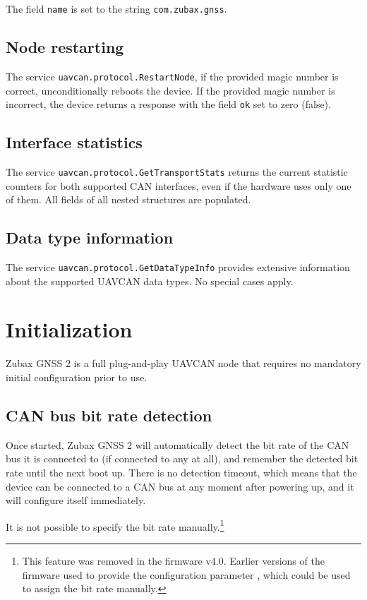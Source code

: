\documentclass{zubaxdoc}
\begin{document}
The field \verb|name| is set to the string \verb|com.zubax.gnss|.

\subsection{Node restarting}

The service \verb|uavcan.protocol.RestartNode|, if the provided magic number is correct,
unconditionally reboots the device.
If the provided magic number is incorrect, the device returns a response with the field \verb|ok|
set to zero (false).

\subsection{Interface statistics}

The service \verb|uavcan.protocol.GetTransportStats| returns the current statistic counters
for both supported CAN interfaces, even if the hardware uses only one of them.
All fields of all nested structures are populated.

\subsection{Data type information}

The service \verb|uavcan.protocol.GetDataTypeInfo| provides extensive information about the
supported UAVCAN data types.
No special cases apply.

\section{Initialization}

Zubax GNSS 2 is a full plug-and-play UAVCAN node that requires no mandatory initial configuration prior to use.

\subsection{CAN bus bit rate detection}

Once started, Zubax GNSS 2 will automatically detect the bit rate of the CAN bus it is connected to
(if connected to any at all), and remember the detected bit rate until the next boot up.
There is no detection timeout, which means that the device can be connected to a CAN bus at
any moment after powering up, and it will configure itself immediately.

It is not possible to specify the bit rate manually.\footnote{This feature was removed in the firmware v4.0.
Earlier versions of the firmware used to provide the configuration parameter
, which could be used to assign the bit rate manually.}
\end{document}

